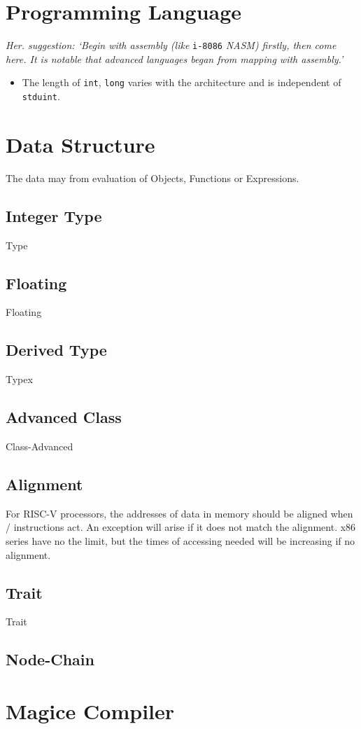 
\section{Programming Language}

\textit{Her. suggestion: `Begin with assembly (like} \verb|i-8086| \textit{NASM) firstly, then come here. It is notable that advanced languages began from mapping with assembly.'}

\begin{itemize}
	\item The length of \verb`int`, \verb`long` varies with the architecture
		and is independent of \verb`stduint`.
\end{itemize}



\section{Data Structure}

The data may from evaluation of Objects, Functions or Expressions.

\subsection{Integer Type}
{Type}

\subsection{Floating}
{Floating}

\subsection{Derived Type}
{Typex}

\subsection{Advanced Class}
{Class-Advanced}

\subsection{Alignment}

For RISC-V processors, the addresses of data in memory should be aligned when / instructions act. An exception will arise if it does not match the alignment.
x86 series have no the limit, but the times of accessing needed will be increasing if no alignment.

\subsection{Trait}
{Trait}

\subsection{Node-Chain}


\section{Magice Compiler}


